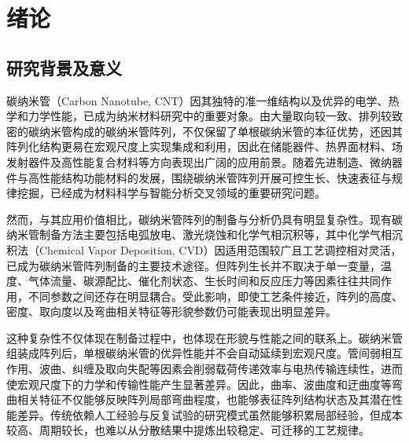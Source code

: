 \chapter{绪论}
\label{chap:intro}

\section{研究背景及意义}

碳纳米管（Carbon Nanotube, CNT）因其独特的准一维结构以及优异的电学、热学和力学性能，已成为纳米材料研究中的重要对象\cite{Yin2022AligningCNT}。由大量取向较一致、排列较致密的碳纳米管构成的碳纳米管阵列，不仅保留了单根碳纳米管的本征优势，还因其阵列化结构更易在宏观尺度上实现集成和利用，因此在储能器件\cite{Pint2011Supercapacitor}、热界面材料\cite{Shaikh2007Thermal}、场发射器件\cite{Sohn2001FieldEmission}及高性能复合材料\cite{Zeng2010SandwichComposite}等方向表现出广阔的应用前景。随着先进制造、微纳器件与高性能结构功能材料的发展，围绕碳纳米管阵列开展可控生长、快速表征与规律挖掘，已经成为材料科学与智能分析交叉领域的重要研究问题。

然而，与其应用价值相比，碳纳米管阵列的制备与分析仍具有明显复杂性。现有碳纳米管制备方法主要包括电弧放电、激光烧蚀和化学气相沉积等\cite{Szabo2010CNTMethods}，其中化学气相沉积法（Chemical Vapor Deposition, CVD）因适用范围较广且工艺调控相对灵活，已成为碳纳米管阵列制备的主要技术途径\cite{Liang2014VACNTReviewCN}。但阵列生长并不取决于单一变量，温度、气体流量、碳源配比、催化剂状态、生长时间和反应压力等因素往往共同作用，不同参数之间还存在明显耦合\cite{Bulyarskiy2020}。受此影响，即使工艺条件接近，阵列的高度、密度、取向度以及弯曲相关特征等形貌参数仍可能表现出明显差异。

这种复杂性不仅体现在制备过程中，也体现在形貌与性能之间的联系上。碳纳米管组装成阵列后，单根碳纳米管的优异性能并不会自动延续到宏观尺度。管间弱相互作用、波曲、纠缠及取向失配等因素会削弱载荷传递效率与电热传输连续性，进而使宏观尺度下的力学和传输性能产生显著差异\cite{Ginga2013Waviness,Won2013Entanglement,Gspann2017MorphologyTransport}。因此，曲率、波曲度和迂曲度等弯曲相关特征不仅能够反映阵列局部弯曲程度，也能够表征阵列结构状态及其潜在性能差异。传统依赖人工经验与反复试验的研究模式虽然能够积累局部经验，但成本较高、周期较长，也难以从分散结果中提炼出较稳定、可迁移的工艺规律\cite{Gao2023}。

